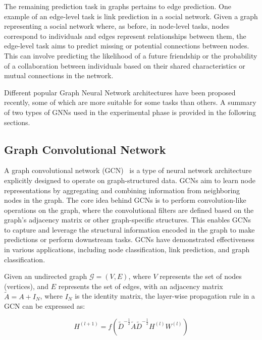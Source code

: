 \documentclass{Configuration_Files/PoliMi3i_thesis}
\begin{document}
    The remaining prediction task in graphs pertains to edge prediction.
    One example of an edge-level task is link prediction in a social network.
    Given a graph representing a social network where, as before, in node-level tasks, nodes correspond to individuals and edges represent relationships between them, the edge-level task aims to predict missing or potential connections between nodes.
    This can involve predicting the likelihood of a future friendship or the probability of a collaboration between individuals based on their shared characteristics or mutual connections in the network.

    Different popular Graph Neural Network architectures have been proposed recently, some of which are more suitable for some tasks than others.
    A summary of two types of GNNs used in the experimental phase is provided in the following sections.

    \subsection{Graph Convolutional Network}
    \label{subsec:graph_convolutional_network}%

    A graph convolutional network (GCN)~\cite{DBLP:journals/corr/KipfW16, daigavane2021understanding} is a type of neural network architecture explicitly designed to operate on graph-structured data.
    GCNs aim to learn node representations by aggregating and combining information from neighboring nodes in the graph.
    The core idea behind GCNs is to perform convolution-like operations on the graph, where the convolutional filters are defined based on the graph's adjacency matrix or other graph-specific structures.
    This enables GCNs to capture and leverage the structural information encoded in the graph to make predictions or perform downstream tasks.
    GCNs have demonstrated effectiveness in various applications, including node classification, link prediction, and graph classification.

    Given an undirected graph $\mathcal{G} = (V, E)$, where $V$ represents the set of nodes (vertices), and $E$ represents the set of edges, with an adjacency matrix $\tilde{A}=A+I_N$, where $I_N$ is the identity matrix, the layer-wise propagation rule in a GCN can be expressed as:

    \begin{equation}
        \label{eq:gcn_convolution}
            H^{(l+1)} = f(\tilde{D}^{-\tfrac{1}{2}}  \tilde{A}  \tilde{D}^{-\tfrac{1}{2}}  H^{(l)}  W^{(l)})
    \end{equation}
\end{document}
